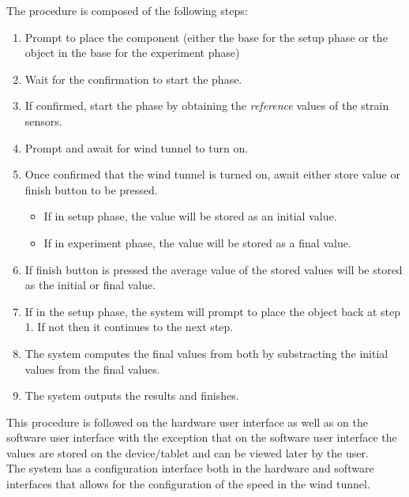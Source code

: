 	The procedure is composed of the following steps:
	\begin{enumerate}
		\item Prompt to place the component (either the base for the setup phase or the object in the base for the experiment phase)
		\item Wait for the confirmation to start the phase.
		\item If confirmed, start the phase by obtaining the \emph{reference} values of the strain sensors.
		\item Prompt and await for wind tunnel to turn on.
		\item Once confirmed that the wind tunnel is turned on, await either store value or finish button to be pressed.
		\begin{itemize}
			\item If in setup phase, the value will be stored as an initial value.
			\item If in experiment phase, the value will be stored as a final value.
		\end{itemize}
		\item If finish button is pressed the average value of the stored values will be stored as the initial or final value.
		\item If in the setup phase, the system will prompt to place the object back at step 1. If not then it continues to the next step.
		\item The system computes the final values from both by substracting the initial values from the final values.
		\item The system outputs the results and finishes.
	\end{enumerate}

	This procedure is followed on the hardware user interface as well as on the software user interface with the exception that on the software user interface the values are stored on the device/tablet and can be viewed later by the user.\\

	The system has a configuration interface both in the hardware and software interfaces that allows for the configuration of the speed in the wind tunnel.

\newpage